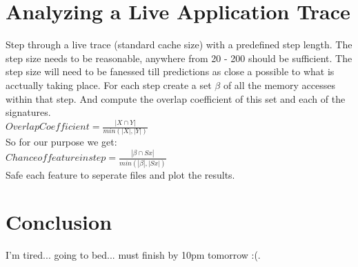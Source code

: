 \documentclass[11pt,a4paper, titlepage, oneside]{article}
\begin{document}
\section{Analyzing a Live Application Trace}
Step through a live trace (standard cache size) with a predefined step length. The step size needs to be reasonable, anywhere from 20 - 200 should be sufficient. The step size will need to be fanessed till predictions as close a possible to what is acctually taking place. For each step create a set $\beta$ of all the memory accesses within that step. And compute the overlap coefficient of this set and each of the signatures. \\
$Overlap Coefficient = \frac{|X\cap Y|}{min(|X|,|Y|)}$ \\
So for our purpose we get: \\
$Chance of feature in step = \frac{|\beta\cap Sx|}{min(|\beta|, |Sx|)}$ \\
Safe each feature to seperate files and plot the results.

\section{Conclusion}
I'm tired... going to bed... must finish by 10pm tomorrow :(.
\end{document}
